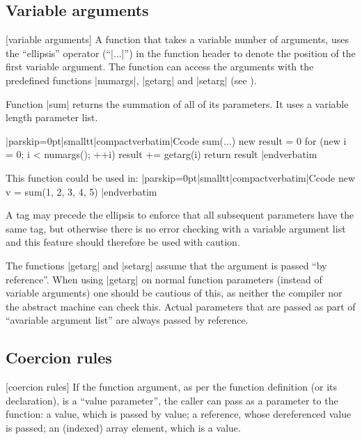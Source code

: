 \subsection{Variable arguments}
 [variable arguments] 
A function that takes a variable number of arguments, uses the ``ellipsis''
operator (``|...|'') in the function header to denote the position of the
first variable argument. The function can access the arguments with the
predefined functions |numargs|, |getarg| and |setarg| (see
).

Function |sum| returns the summation of all of its parameters. It uses a
variable length parameter list.

\listingx\verbatim|parskip=0pt|smalltt|compactverbatim|Ccode
sum(...)
    {
    new result = 0
    for (new i = 0; i < numargs(); ++i)
        result += getarg(i)
    return result
    }
|endverbatim\endlistingx

This function could be used in:
\listingx\verbatim|parskip=0pt|smalltt|compactverbatim|Ccode
new v = sum(1, 2, 3, 4, 5)
|endverbatim\endlistingx

\noindent{}%
A tag may precede the ellipsis to enforce that all subsequent parameters
have the same tag, but otherwise there is no error checking with a variable
argument list and this feature should therefore be used with caution.

 
The functions |getarg| and |setarg| assume that the argument is passed ``by reference''.
When using |getarg| on normal function parameters (instead of variable arguments)
one should be cautious of this, as neither the compiler nor the abstract machine
can check this. Actual parameters that are passed as part of ``avariable argument
list'' are always passed by reference.


\subsection{Coercion rules}
 [coercion rules]
If the function argument, as per the function definition (or its declaration), is a
``value parameter'', the caller can pass as a parameter to the function:
\beginlist{1em} \compactlist
\list{\lbullet} a value, which is passed by value;
\list{\lbullet} a reference, whose dereferenced value is passed;
\list{\lbullet} an (indexed) array element, which is a value.
\endlist \goodbreak

